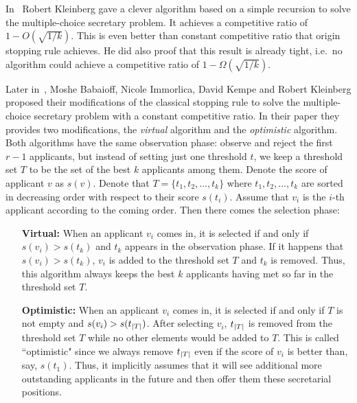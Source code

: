 In~\cite{kleinberg2005multiple} Robert Kleinberg gave a clever algorithm
based on a simple recursion to solve the multiple-choice secretary problem.
It achieves a competitive ratio of $1 - O(\sqrt{1 / k})$. 
This is even better than constant competitive ratio that origin stopping 
rule achieves. He did also proof that this result is already tight,
i.e.\ no algorithm could achieve a competitive ratio of 
$1 - \Omega(\sqrt{1 / k})$.

Later in~\cite{babaioff2007knapsack}, Moshe Babaioff, Nicole Immorlica,
David Kempe and Robert Kleinberg proposed their modifications of the 
classical stopping rule to solve the multiple-choice secretary problem
with a constant competitive ratio.
In their paper they provides two modifications, the \emph{virtual} algorithm
and the \emph{optimistic} algorithm. Both algorithms have the same
observation phase: observe and reject the first $r - 1$ applicants, but
instead of setting just one threshold $t$, we keep a threshold set $T$ to
be the set of the best $k$ applicants among them.
Denote the score of applicant $v$ as $s(v)$.
Denote that $T = \{t_1, t_2, \dots, t_{k}\}$ where 
$t_1, t_2, \dots, t_{k}$ are sorted in decreasing order with respect
to their score $s(t_i)$. 
Assume that $v_i$ is the $i$-th applicant according to the coming order.
Then there comes the selection phase:
\begin{itemize}
    \item[{\bf Virtual:} ]
        When an applicant $v_i$ comes in, it is selected if and only if
        $s(v_i) > s(t_{k})$ and $t_{k}$ appears in the
        observation phase. If it happens that $s(v_i) > s(t_{k})$,
        $v_i$ is added to the threshold set $T$ and $t_{k}$ is
        removed. Thus, this algorithm always keeps the best $k$ applicants
        having met so far in the threshold set $T$.
    \item[{\bf Optimistic:} ]
        When an applicant $v_i$ comes in, it is selected if and only if
        $T$ is not empty and $s(v_i) > s(t_{\left\vert T\right\vert})$. After selecting
        $v_i$, $t_{\left\vert T\right\vert}$ is removed from the threshold set $T$ while
        no other elements would be added to $T$. This is called
        ``optimistic" since we always remove $t_{\left\vert T\right\vert}$ even if the score
        of $v_i$ is better than, say, $s(t_1)$. Thus, it implicitly assumes
        that it will see additional more outstanding applicants in the
        future and then offer them these secretarial positions.
\end{itemize}

